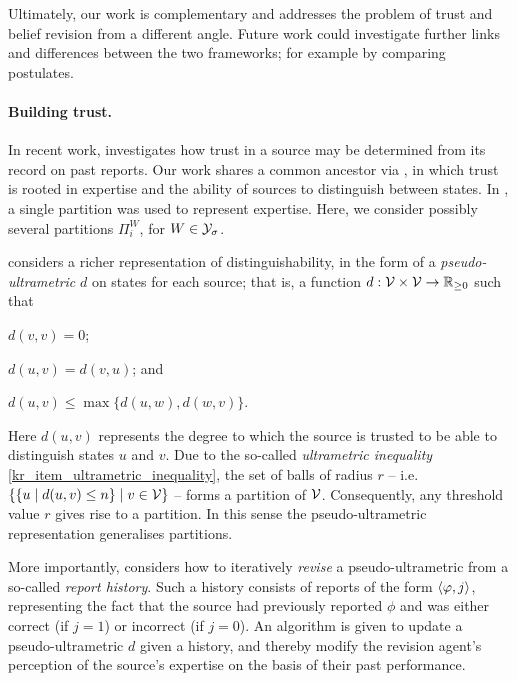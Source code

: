 Ultimately, our work is complementary and addresses the problem of trust and
belief revision from a different angle. Future work could investigate further
links and differences between the two frameworks; for example by comparing
postulates.

\paragraph{Building trust.} In recent work, \textcite{hunter_building_21}
investigates how trust in a source may be determined from its record on past
reports. Our work shares a common ancestor via \cite{booth_trust_2018}, in
which trust is rooted in expertise and the ability of sources to distinguish
between states. In \cite{booth_trust_2018}, a single partition was used to
represent expertise. Here, we consider possibly several partitions $\Pi^W_i$,
for $W \in \mathcal{Y}_\sigma$.

\textcite{hunter_building_21} considers a richer representation of
distinguishability, in the form of a \emph{pseudo-ultrametric} $d$ on states
for each source; that is, a function $d: \mathcal{V} \times \mathcal{V} \to \mathbb{R}_{\ge 0}$
such that
\begin{inlinelist}
    \item $d(v, v) = 0$;
    \item $d(u, v) = d(v, u)$; and
    \item\label{kr_item_ultrametric_inequality}
        $d(u, v) \le \max\{d(u, w), d(w, v)\}$.
\end{inlinelist}
Here $d(u, v)$ represents the degree to which the source is trusted to be able
to distinguish states $u$ and $v$. Due to the so-called \emph{ultrametric
inequality} \cref{kr_item_ultrametric_inequality}, the set of balls of radius
$r$ -- i.e. $\{\{u \mid d(u, v) \le n\} \mid v \in \mathcal{V}\}$ -- forms a
partition of $\mathcal{V}$. Consequently, any threshold value $r$ gives rise to a
partition. In this sense the pseudo-ultrametric representation generalises
partitions.

More importantly, \textcite{hunter_building_21} considers how to iteratively
\emph{revise} a pseudo-ultrametric from a so-called \emph{report history}. Such
a history consists of reports of the form $\langle {\varphi, j} \rangle$, representing the
fact that the source had previously reported $\phi$ and was either correct (if
$j = 1$) or incorrect (if $j = 0$). An algorithm is given to update a
pseudo-ultrametric $d$ given a history, and thereby modify the revision agent's
perception of the source's expertise on the basis of their past performance.

